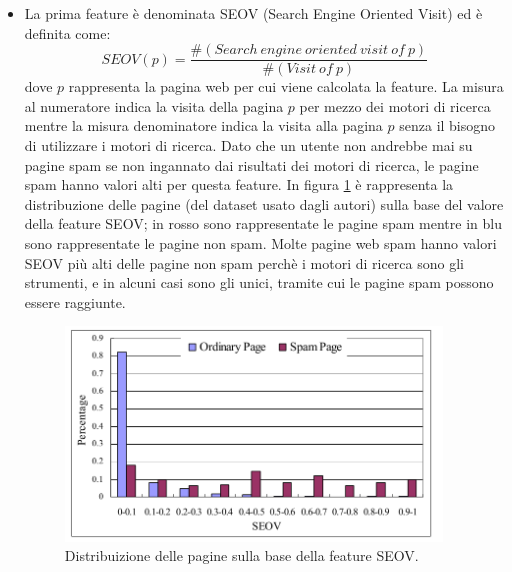 \begin{itemize}
 \item La prima feature è denominata SEOV (Search Engine Oriented Visit) ed è definita come:
 \begin{equation}
  SEOV(p)=\frac{\#(Search\ engine\ oriented\ visit\ of\ p)}{\#(Visit\ of\ p)}
 \end{equation}
  dove \(p\) rappresenta la pagina web per cui viene calcolata la feature. La misura al numeratore indica la visita della pagina \(p\) per mezzo dei motori di ricerca mentre la misura denominatore indica la visita alla pagina \(p\) senza il bisogno di utilizzare i motori di ricerca. Dato che un utente non andrebbe mai su pagine spam se non ingannato dai risultati dei motori di ricerca, le pagine spam hanno valori alti per questa feature. In figura \ref{img:seov} è rappresenta la distribuzione delle pagine (del dataset usato dagli autori) sulla base del valore della feature SEOV; in rosso sono rappresentate le pagine spam mentre in blu sono rappresentate le pagine non spam. Molte pagine web spam hanno valori SEOV più alti delle pagine non spam perchè i motori di ricerca sono gli strumenti, e in alcuni casi sono gli unici, tramite cui le pagine spam possono essere raggiunte.
\begin{figure}
\centering
\includegraphics[width=10cm]{immagini/altre/seov.png}
\caption{Distribuizione delle pagine sulla base della feature SEOV.}
\label{img:seov}
\end{figure}
  

\end{itemize}
